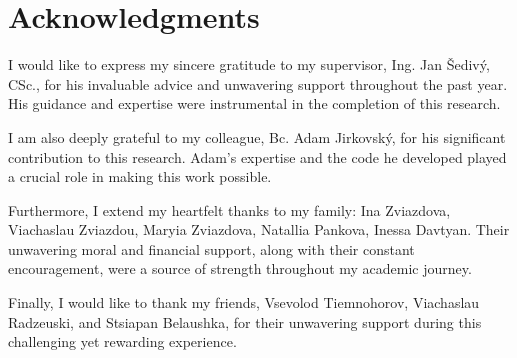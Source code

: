 
\section*{Acknowledgments}

I would like to express my sincere gratitude to my supervisor, Ing. Jan Šedivý, CSc., for his invaluable advice and unwavering support throughout the past year.
His guidance and expertise were instrumental in the completion of this research.

I am also deeply grateful to my colleague, Bc. Adam Jirkovský, for his significant contribution to this research.
Adam's expertise and the code he developed played a crucial role in making this work possible.

Furthermore, I extend my heartfelt thanks to my family: Ina Zviazdova, Viachaslau Zviazdou, Maryia Zviazdova, Natallia Pankova, Inessa Davtyan.
Their unwavering moral and financial support, along with their constant encouragement, were a source of strength throughout my academic journey.

Finally, I would like to thank my friends, Vsevolod Tiemnohorov, Viachaslau Radzeuski, and Stsiapan Belaushka, for their unwavering support during this challenging yet rewarding experience.

\vspace{2.5cm}
